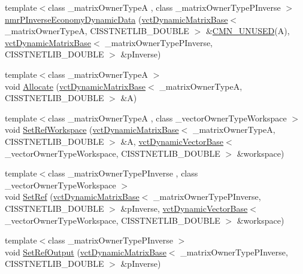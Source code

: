 \begin{DoxyCompactItemize}
{\footnotesize template$<$class \-\_\-matrix\-Owner\-Type\-A , class \-\_\-matrix\-Owner\-Type\-P\-Inverse $>$ }\\\hyperlink{classnmr_p_inverse_economy_dynamic_data_a2991bc2e206de01652bafd3c00879599}{nmr\-P\-Inverse\-Economy\-Dynamic\-Data} (\hyperlink{classvct_dynamic_matrix_base}{vct\-Dynamic\-Matrix\-Base}$<$ \-\_\-matrix\-Owner\-Type\-A, C\-I\-S\-S\-T\-N\-E\-T\-L\-I\-B\-\_\-\-D\-O\-U\-B\-L\-E $>$ \&\hyperlink{cmn_portability_8h_a021894e2626935fa2305434b1e893ff6}{C\-M\-N\-\_\-\-U\-N\-U\-S\-E\-D}(A), \hyperlink{classvct_dynamic_matrix_base}{vct\-Dynamic\-Matrix\-Base}$<$ \-\_\-matrix\-Owner\-Type\-P\-Inverse, C\-I\-S\-S\-T\-N\-E\-T\-L\-I\-B\-\_\-\-D\-O\-U\-B\-L\-E $>$ \&p\-Inverse)
\item 
{\footnotesize template$<$class \-\_\-matrix\-Owner\-Type\-A $>$ }\\void \hyperlink{classnmr_p_inverse_economy_dynamic_data_ab8170dc98fbe8c8d0035f4e08d48131e}{Allocate} (\hyperlink{classvct_dynamic_matrix_base}{vct\-Dynamic\-Matrix\-Base}$<$ \-\_\-matrix\-Owner\-Type\-A, C\-I\-S\-S\-T\-N\-E\-T\-L\-I\-B\-\_\-\-D\-O\-U\-B\-L\-E $>$ \&A)
\item 
{\footnotesize template$<$class \-\_\-matrix\-Owner\-Type\-A , class \-\_\-vector\-Owner\-Type\-Workspace $>$ }\\void \hyperlink{classnmr_p_inverse_economy_dynamic_data_a34c63c7d6807e6c8977042abb88091bb}{Set\-Ref\-Workspace} (\hyperlink{classvct_dynamic_matrix_base}{vct\-Dynamic\-Matrix\-Base}$<$ \-\_\-matrix\-Owner\-Type\-A, C\-I\-S\-S\-T\-N\-E\-T\-L\-I\-B\-\_\-\-D\-O\-U\-B\-L\-E $>$ \&A, \hyperlink{classvct_dynamic_vector_base}{vct\-Dynamic\-Vector\-Base}$<$ \-\_\-vector\-Owner\-Type\-Workspace, C\-I\-S\-S\-T\-N\-E\-T\-L\-I\-B\-\_\-\-D\-O\-U\-B\-L\-E $>$ \&workspace)
\item 
{\footnotesize template$<$class \-\_\-matrix\-Owner\-Type\-P\-Inverse , class \-\_\-vector\-Owner\-Type\-Workspace $>$ }\\void \hyperlink{classnmr_p_inverse_economy_dynamic_data_ad2c665813d6e5c8a15d8768eb05f30b9}{Set\-Ref} (\hyperlink{classvct_dynamic_matrix_base}{vct\-Dynamic\-Matrix\-Base}$<$ \-\_\-matrix\-Owner\-Type\-P\-Inverse, C\-I\-S\-S\-T\-N\-E\-T\-L\-I\-B\-\_\-\-D\-O\-U\-B\-L\-E $>$ \&p\-Inverse, \hyperlink{classvct_dynamic_vector_base}{vct\-Dynamic\-Vector\-Base}$<$ \-\_\-vector\-Owner\-Type\-Workspace, C\-I\-S\-S\-T\-N\-E\-T\-L\-I\-B\-\_\-\-D\-O\-U\-B\-L\-E $>$ \&workspace)
\item 
{\footnotesize template$<$class \-\_\-matrix\-Owner\-Type\-P\-Inverse $>$ }\\void \hyperlink{classnmr_p_inverse_economy_dynamic_data_aff2f7631c782b912f75b8d7b18cff923}{Set\-Ref\-Output} (\hyperlink{classvct_dynamic_matrix_base}{vct\-Dynamic\-Matrix\-Base}$<$ \-\_\-matrix\-Owner\-Type\-P\-Inverse, C\-I\-S\-S\-T\-N\-E\-T\-L\-I\-B\-\_\-\-D\-O\-U\-B\-L\-E $>$ \&p\-Inverse)
\end{DoxyCompactItemize}
